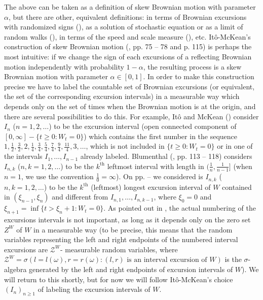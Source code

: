 \documentclass[reqno]{amsart}
\theoremstyle{definition}
\theoremstyle{remark}
\numberwithin{equation}{section}
\begin{document}
The above can be taken as a definition of skew Brownian motion with parameter $\alpha$, but there are other, equivalent definitions: in terms of Brownian excursions with randomized signs (\cite{Ito-McKean}), as a solution of stochastic equation or as a limit of random walks (\cite{Harrison-Shepp}), in terms of the speed and scale measure (\cite{Walsh}), etc. It\^{o}-McKean's construction of skew Brownian motion (\cite{Ito-McKean}, pp. 75 -- 78 and p. 115) is perhaps the most intuitive: if we change the sign of each excursions of a reflecting Brownian motion independently with probability $1-\alpha$, the resulting process is a skew Brownian motion with parameter $\alpha\in[0,1]$. In order to make this construction precise we have to label the countable set of Brownian excursions (or equivalent, the set of the corresponding excursion intervals) in a measurable way which depends only on the set of times when the Brownian motion is at the origin, and there are several possibilities to do this. For example, It\^{o} and McKean (\cite{Ito-McKean}) consider  $I_n$ ($n= 1,2,\ldots$) to be the excursion interval (open connected component of $[0,\infty]-\{t\ge 0:W_t=0\}$) which contains the first number in the sequence $1,\frac12,\frac32,2,\frac14,\frac34,\frac54,\frac74,\frac94, \frac{11}4,3,\ldots$, which is not included in $\{t\ge 0:W_t=0\}$ or in one of the intervals $I_1,\ldots,I_{n-1}$ already labeled. Blumenthal (\cite{Blumenthal}, pp. 113 -- 118) considers $I_{n,k}$ ($n,k= 1,2,\ldots$) to be the $k^\text{th}$ leftmost interval with length in $(\frac{1}{n},\frac1{n-1}]$ (when $n=1$, we use the convention $\frac10=\infty$). On pp. \pageref{sign choice} -- \pageref{iid sign choice} we considered is $I_{n,k}$ ($n,k= 1,2,\ldots$) to be the $k^\text{th}$ (leftmost) longest excursion interval of $W$ contained in $(\xi_{n-1},\xi_n)$ and different from $I_{n,1},\ldots,I_{n,k-1}$, where $\xi_0=0$ and $\xi_{n+1}=\inf\{t>\xi_n+1: W_t=0\}$. As pointed out in \cite{Blumenthal}, the actual numbering of the excursions intervals is not important, as long as it depends only on the zero set $Z^W$ of $W$ in a measurable way (to be precise, this means that the random variables representing the left and right endpoints of the numbered interval excursions are $\mathcal{Z}^W$- measurable random variables, where $\mathcal{Z}^W=\sigma(l=l(\omega),r=r(\omega): (l,r) \text{ is an interval excursion of } W)$ is the $\sigma$-algebra generated by the left and right endpoints of excursion intervals of $W$). We will return to this shortly, but for now we will follow It\^{o}-McKean's choice $(I_n)_{n\ge 1}$ of labeling the excursion intervals of $W$.
\end{document}
